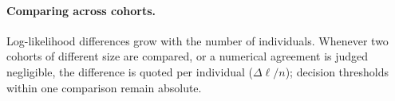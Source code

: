\paragraph{Comparing across cohorts.} Log-likelihood differences grow with the number of individuals. Whenever two
cohorts of different size are compared, or a numerical agreement is judged negligible, the difference is quoted per
individual ($\Delta\ell/n$); decision thresholds within one comparison remain absolute.
